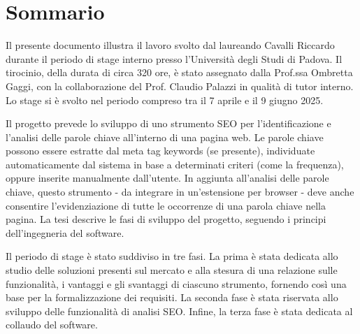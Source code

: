 \cleardoublepage
{}
{}
\begingroup
\let\clearpage\relax
\let\cleardoublepage\relax
\let\cleardoublepage\relax

\chapter*{Sommario}

Il presente documento illustra il lavoro svolto dal laureando Cavalli Riccardo durante il periodo di stage interno presso l’Università degli Studi di Padova. Il tirocinio, della durata di circa 320 ore, è stato assegnato dalla Prof.ssa Ombretta Gaggi, con la collaborazione del Prof. Claudio Palazzi in qualità di tutor interno. Lo stage si è svolto nel periodo compreso tra il 7 aprile e il 9 giugno 2025.

\vspace{10pt}
\noindent Il progetto prevede lo sviluppo di uno strumento SEO per l’identificazione e l’analisi delle parole chiave all’interno di una pagina web. Le parole chiave possono essere estratte dal meta tag keywords (se presente), individuate automaticamente dal sistema in base a determinati criteri (come la frequenza), oppure inserite manualmente dall’utente. In aggiunta all’analisi delle parole chiave, questo strumento - da integrare in un’estensione per browser - deve anche consentire l’evidenziazione di tutte le occorrenze di una parola chiave nella pagina. La tesi descrive le fasi di sviluppo del progetto, seguendo i principi dell’ingegneria del software.

\vspace{10pt}
\noindent Il periodo di stage è stato suddiviso in tre fasi. La prima è stata dedicata allo studio delle soluzioni presenti sul mercato e alla stesura di una relazione sulle funzionalità, i vantaggi e gli svantaggi di ciascuno strumento, fornendo così una base per la formalizzazione dei requisiti. La seconda fase è stata riservata allo sviluppo delle funzionalità di analisi SEO. Infine, la terza fase è stata dedicata al collaudo del software.




\endgroup

\vfill
